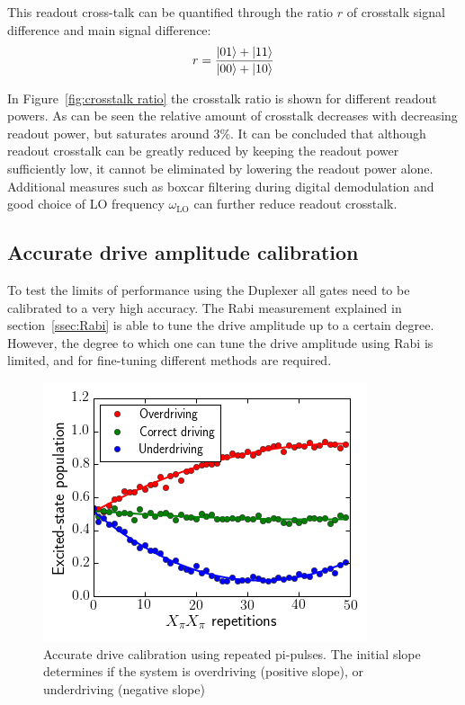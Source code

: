           This readout cross-talk can be quantified through the ratio $r$ of crosstalk signal difference and main signal difference:
          \begin{equation}
            r=\frac{\ket{01}+\ket{11}}{\ket{00} + \ket{10}}
            \label{eq:crosstalk ratio}
          \end{equation}

          In Figure~\ref{fig:crosstalk ratio} the crosstalk ratio is shown for different readout powers. As can be seen the relative amount of crosstalk decreases with decreasing readout power, but saturates around $3\%$. It can be concluded that although readout crosstalk can be greatly reduced by keeping the readout power sufficiently low, it cannot be eliminated by lowering the readout power alone. Additional measures such as boxcar filtering during digital demodulation and good choice of LO frequency $\omega_\text{LO}$ can further reduce readout crosstalk.

      \subsection{Accurate drive amplitude calibration}
        \label{ssec:PiX360}
        To test the limits of performance using the Duplexer all gates need to be calibrated to a very high accuracy. The Rabi measurement explained in section~\ref{ssec:Rabi} is able to tune the drive amplitude up to a certain degree. However, the degree to which one can tune the drive amplitude using Rabi is limited, and for fine-tuning different methods are required.

        \begin{figure}[tb]
          \centering
          \includegraphics[width=.6\linewidth]{../Figures/Calibration routines/Drive calibration.png}
          \caption{Accurate drive calibration using repeated pi-pulses. The initial slope determines if the system is overdriving (positive slope), or underdriving (negative slope)}
          \label{fig:PiX360}
        \end{figure}

